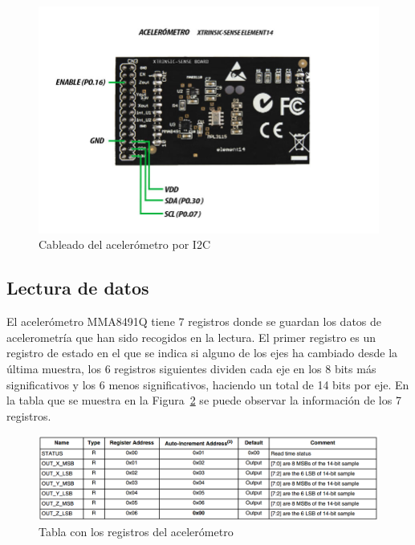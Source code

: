 \begin{figure}[h]%
	\centering
    \includegraphics[scale=0.6]{figures/estructura_xtrinsic.jpg} %
    \caption[Cableado del acelerómetro por I2C]{Cableado del acelerómetro por I2C}
   	\label{figuraXtrinsic}
\end{figure}

\subsection{Lectura de datos}
\label{makereference5.1.1}

El acelerómetro MMA8491Q tiene 7 registros donde se guardan los datos de acelerometría que han sido recogidos en la lectura. El primer registro es un registro de estado en el que se indica si alguno de los ejes ha cambiado desde la última muestra, los 6 registros siguientes dividen cada eje en los 8 bits más significativos y los 6 menos significativos, haciendo un total de 14 bits por eje. En la tabla que se muestra en la Figura~\ref{figuraRegistrosAcc} se puede observar la información de los 7 registros.

\begin{figure}[h]%
	\centering
    \includegraphics[width=\textwidth]{figures/registros_Acelerometro.png} %
    \caption[Registros del acelerómetro]{Tabla con los registros del acelerómetro~\cite{DatasheetAcc}}
   	\label{figuraRegistrosAcc}
\end{figure}

